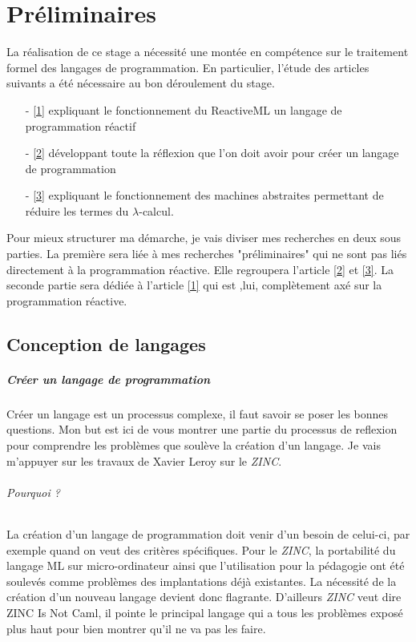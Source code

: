 \documentclass[10pt,a4paper]{report}
\begin{document}
\chapter{Préliminaires}
La réalisation de ce stage a nécessité une montée en compétence sur le traitement formel des langages de programmation. En particulier, l'étude des articles
suivants a été nécessaire au bon déroulement du stage.
\begin{enumerate}
\item[-] \hyperref[ReactiveML]{[1]} expliquant le fonctionnement du ReactiveML un langage de programmation réactif
\item[-] \hyperref[ZINC]{[2]}  développant toute la réflexion que l'on doit avoir pour créer un langage de programmation
\item[-] \hyperref[Calculi]{[3]} expliquant le fonctionnement des machines abstraites permettant de réduire les termes du $\lambda $-calcul.
\end{enumerate}
Pour mieux structurer ma démarche, je vais diviser mes recherches en deux sous parties. La première sera liée à mes recherches "préliminaires" qui ne sont pas liés directement à la programmation réactive. Elle regroupera l'article \hyperref[ZINC]{[2]} et \hyperref[Calculi]{[3]}. La seconde partie sera dédiée à l'article \hyperref[ReactiveML]{[1]} qui est ,lui, complètement axé sur la programmation réactive. 

\section{Conception de langages}

\paragraph{Créer un langage de programmation}
Créer un langage est un processus complexe, il faut savoir se poser les bonnes questions. Mon but est ici de vous
montrer une partie du processus de reflexion pour comprendre les problèmes que soulève la création d'un langage.
Je vais m'appuyer sur les travaux de Xavier Leroy sur le \textit{ZINC}.
\medbreak

\subparagraph{Pourquoi ?} 
La création d'un langage de programmation doit venir d'un besoin de celui-ci, par exemple quand on veut des critères spécifiques.
Pour le \textit{ZINC}, la portabilité du langage ML sur micro-ordinateur ainsi que l'utilisation pour la pédagogie ont été soulevés
comme problèmes des implantations déjà existantes. La nécessité de la création d'un nouveau langage devient donc flagrante.
D'ailleurs \textit{ZINC} veut dire ZINC Is Not Caml, il pointe le principal langage qui a tous les problèmes exposé plus haut
pour bien montrer qu'il ne va pas les faire. 
\end{document}
